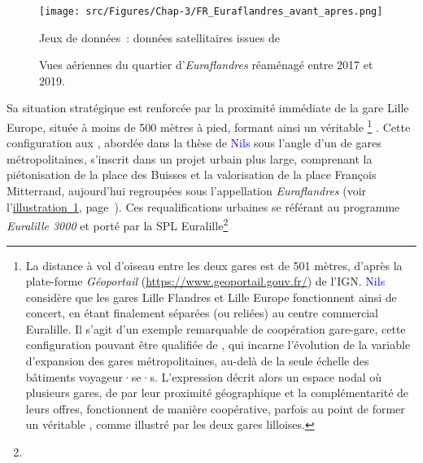 \begin{refsegment}
    \begin{figure}[h!]\vspace*{4pt}
        \caption{Vues aériennes du quartier d'\textsl{Euraflandres} réaménagé entre 2017 et 2019.}
        \label{fig-chap3:euraflandres-avant-apres}
        \centerline{\texttt{[image: src/Figures/Chap-3/FR\_Euraflandres\_avant\_apres.png]}}
        \vspace{5pt}
        \begin{flushright}\scriptsize{
        Jeux de données~: données satellitaires issues de \textcolor{blue}{\textcite{ign_remonter_2025}}
        }\end{flushright}
    \end{figure}

Sa situation stratégique est renforcée par la proximité immédiate de la gare Lille Europe, située à moins de 500 mètres à pied, formant ainsi un véritable \footnote{
    La distance à vol d'oiseau entre les deux gares est de 501 mètres, d'après la plate-forme \textsl{Géoportail} (\url{https://www.geoportail.gouv.fr/}) de l'\acrfull{IGN}. \textcolor{blue}{Nils} \textcolor{blue}{\textcite[415-416]{le_bot_quel_2019}} considère que les gares Lille Flandres et Lille Europe fonctionnent ainsi de concert, en étant finalement séparées (ou reliées) au centre commercial Euralille. Il s'agit d'un exemple remarquable de coopération gare-gare, cette configuration pouvant être qualifiée de , qui incarne l'évolution  de la variable d'expansion des gares métropolitaines, au-delà de la seule échelle des bâtiments voyageur·se·s. L'expression  décrit alors un espace nodal où plusieurs gares, de par leur proximité géographique et la complémentarité de leurs offres, fonctionnent de manière coopérative, parfois au point de former un véritable , comme illustré par les deux gares lilloises.
} \textcolor{blue}{\autocite[415-416]{le_bot_quel_2019}}. Cette configuration aux  \textcolor{blue}{\autocite[334]{bertolini_nodes_1996}}, abordée dans la thèse de \textcolor{blue}{Nils} \textcolor{blue}{\textcite[415-416]{le_bot_quel_2019}} sous l'angle d'un  de gares métropolitaines, s'inscrit dans un projet urbain plus large, comprenant la piétonisation de la place des Buisses et la valorisation de la place François Mitterrand, aujourd'hui regroupées sous l'appellation \textsl{Euraflandres} (voir l'\hyperref[fig-chap3:euraflandres-avant-apres]{illustration~\ref{fig-chap3:euraflandres-avant-apres}}, page~\pageref{fig-chap3:euraflandres-avant-apres}). Ces requalifications urbaines se référant au programme \textsl{Euralille 3000} et porté par la \acrfull{SPL} Euralille\footnote{
}
\end{refsegment}
